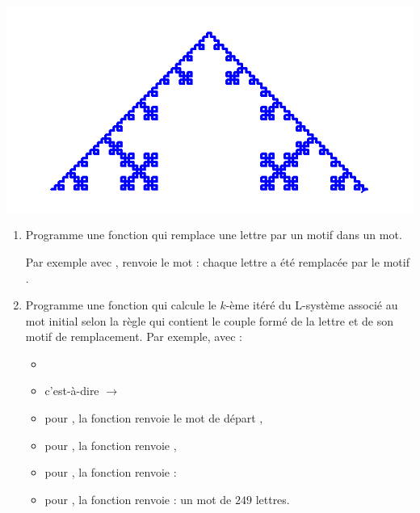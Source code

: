 \documentclass[11pt,class=report,crop=false]{standalone}
\begin{document}
\begin{activite}



\begin{center}
\includegraphics[scale=\myscale,scale=0.4]{ecran-lsysteme-2}
\end{center}

\begin{enumerate}
  \item Programme une fonction  qui remplace une lettre par un motif dans un mot. 

Par exemple avec ,  renvoie le mot  : chaque lettre  a été remplacée par le motif .
 
  \item Programme une fonction 
  qui calcule le $k$-ème itéré du L-système associé au mot initial  selon la règle  qui contient le couple formé de la lettre et de son motif de remplacement.
  Par exemple, avec :
  \begin{itemize}
    \item {}
    \item {} c'est-à-dire  $\rightarrow$ 
    \item pour , la fonction renvoie le mot de départ ,
    \item pour , la fonction renvoie ,
    \item pour , la fonction renvoie :\\ \centerline{}
    \item pour , la fonction renvoie :  un mot de $249$ lettres.
    

\end{itemize}
\end{enumerate}
\end{activite}
\end{document}

